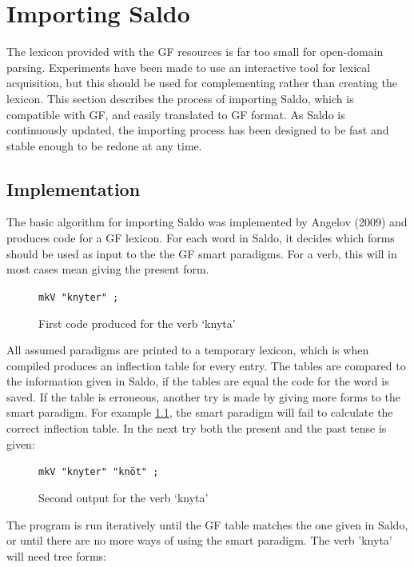 \documentclass{report}
\begin{document}
\chapter{Importing Saldo}
\label{sec:prog.saldo}
The lexicon provided with the GF resources is far too small for open-domain parsing.
Experiments have been made to use an interactive tool for lexical acquisition,
but this should be used for complementing rather than creating the lexicon.
This section describes the process of importing Saldo, which is 
compatible with GF, and easily translated to GF format.
As Saldo is continuously updated, the importing process has been designed to be fast
and stable enough to be redone at any time.

\section{Implementation}
The basic algorithm for importing Saldo was implemented by Angelov (2009)
and  produces code for a GF lexicon.
For each word in Saldo, it decides which forms should be used as input
to the the GF smart paradigms. For a verb, this will in most cases mean giving
the present form. \\

\begin{figure}[h]
\verb-mkV "knyter" ;-
\caption{First code produced for the verb `knyta'}
\label{fig:saldoknyt}
\end{figure}

All assumed paradigms are printed to a temporary lexicon, 
which is when compiled produces an inflection table
for every entry. The tables are compared to the information given
in Saldo, if the tables are equal the code for the word is saved. If the table
is erroneous, another try is made
by giving more forms to the smart paradigm.
For example \ref{fig:saldoknyt}, the smart paradigm will fail to calculate the
correct inflection table. In the next try both the present and the past tense
is given:\\

\begin{figure}[h]
\verb-mkV "knyter" "knöt" ;-
\caption{Second output for the verb `knyta'}
\label{fig:saldoknyt2}
\end{figure}
The program is run iteratively until the GF table matches the one given in Saldo,
or until there are no more ways of using the smart paradigm. The verb 'knyta'
will need tree forms:\\
\end{document}
